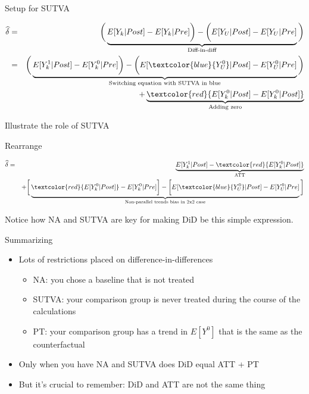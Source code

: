 \documentclass{beamer}
\begin{document}
\begin{frame}{Setup for SUTVA}

\begin{eqnarray*}
\widehat{\delta}& =& \bigg ( \underbrace{E[Y_k|Post] - E[Y_k|Pre] \bigg ) - \bigg ( E[Y_U | Post ] - E[ Y_U | Pre]}_{\mathclap{\text{Diff-in-diff}}} \bigg) \\ 
&=& \bigg ( \underbrace{E[Y^1_k|Post] - E[Y^0_k|Pre] \bigg ) - \bigg ( E[\textcolor{blue}{Y^0_U} | Post ] - E[ Y^0_U | Pre]}_{\mathclap{\text{Switching equation with SUTVA in blue}}} \bigg)   \\
&&+ \underbrace{\textcolor{red}{E[Y_k^0 |Post] - E[Y^0_k | Post]}}_{\mathclap{\text{Adding zero}}}
\end{eqnarray*}


\end{frame}

\begin{frame}{Illustrate the role of SUTVA}


Rearrange

\begin{eqnarray*}
\widehat{\delta} &=& \underbrace{E[Y^1_k | Post] - \textcolor{red}{E[Y^0_k | Post]}}_{\mathclap{\text{ATT}}} \\
&& + \bigg [  \underbrace{\textcolor{red}{E[Y^0_k | Post]} - E[Y^0_k | Pre] \bigg ] - \bigg [ E[\textcolor{blue}{Y^0_U} | Post] - E[Y_U^0 | Pre] }_{\mathclap{\text{Non-parallel trends bias in 2x2 case}}} \bigg ]
\end{eqnarray*}

\bigskip

Notice how NA and SUTVA are key for making DiD be this simple expression.


\end{frame}

\begin{frame}{Summarizing}

\begin{itemize}

\item Lots of restrictions placed on difference-in-differences
	\begin{itemize}
	\item NA: you chose a baseline that is not treated
	\item SUTVA: your comparison group is never treated during the course of the calculations
	\item PT: your comparison group has a trend in $E[Y^0]$ that is the same as the counterfactual 
	\end{itemize}
\item Only when you have NA and SUTVA does DiD equal ATT + PT
\item But it's crucial to remember: DiD and ATT are not the same thing

\end{itemize}

\end{frame}
\end{document}
